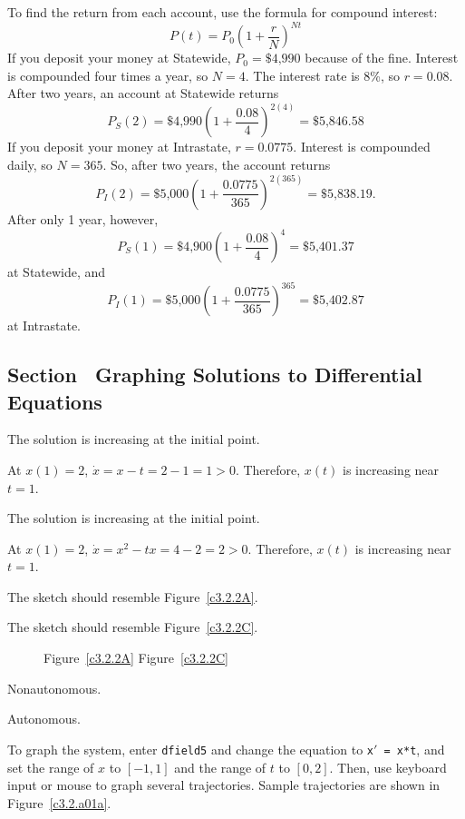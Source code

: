 \documentclass{ximera}
\begin{document}
\soln To find the return from each account, use the formula for
compound interest:
\[
P(t) = P_0\left(1 + \frac{r}{N}\right)^{Nt}
\]
If you deposit your money at Statewide, $P_0 = \$4\mbox{,}990$ because of the
fine.  Interest is compounded four times a year, so $N = 4$.  The interest
rate is 8\%, so $r = 0.08$.
After two years, an account at Statewide returns
\[
P_{S}(2) = \$4\mbox{,}990\left(1 + \frac{0.08}{4}\right)^{2(4)} = 
\$5\mbox{,}846.58
\]
If you deposit your money at Intrastate, $r = 0.0775$.  Interest is
compounded daily, so $N = 365$.  So, after two years, the account returns
\[
P_{I}(2) = \$5\mbox{,}000\left(1 + \frac{0.0775}{365}\right)^{2(365)} = 
\$5\mbox{,}838.19.
\]
After only 1 year, however,
\[
P_{S}(1) = \$4\mbox{,}900\left(1 + \frac{0.08}{4}\right)^{4} = \$5\mbox{,}401.37
\]
at Statewide, and
\[
P_{I}(1) = \$5\mbox{,}000\left(1 + \frac{0.0775}{365}\right)^{365} = 
\$5\mbox{,}402.87
\]
at Intrastate.



\subsection*{Section~\protect{\ref{S:3.2}} Graphing Solutions to Differential
Equations}

 \ans The solution is increasing at the initial point.

\soln At $x(1)=2$, $\dot{x}=x-t=2-1=1>0$.  Therefore, $x(t)$ is increasing
near $t=1$.

 \ans The solution is increasing at the initial point.

\soln At $x(1)=2$, $\dot{x}=x^2-tx=4-2=2>0$.  Therefore, $x(t)$ is increasing
near $t=1$.

 The sketch should resemble Figure~\ref{c3.2.2A}.

 The sketch should resemble Figure~\ref{c3.2.2C}.

\begin{figure}[th]
     \centerline{%
     }
        \centerline{Figure~\ref{c3.2.2A}\hspace{2.1in} Figure~\ref{c3.2.2C}}
\end{figure} 

 Nonautonomous.

 Autonomous.

To graph the system, enter {\tt dfield5} and change the equation to
{\tt x$'$ = x*t}, and set the range of $x$ to $[-1,1]$ and the range
of $t$ to $[0,2]$.  Then, use keyboard input or mouse to graph
several trajectories.  Sample trajectories are shown in
Figure~\ref{c3.2.a01a}.
\end{document}

